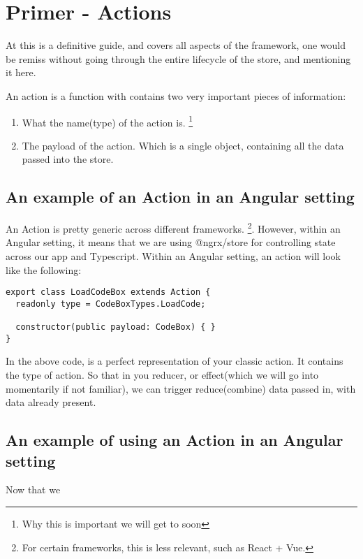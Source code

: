 \maketitle{}
\section{ Primer - Actions }
At this is a definitive guide, and covers all aspects of the framework, one
would be remiss without going through the entire lifecycle of the store, and
mentioning it here.

An action is a function with contains two very important pieces of information:
\begin{enumerate}
  \item What the name(type) of the action is. \footnote{Why this is important we
  will get to soon}
  \item The payload of the action. Which is a single object, containing all the
  data passed into the store.
\end{enumerate}

\subsection{An example of an Action in an Angular setting}
An Action is pretty generic across different frameworks. \footnote{For certain
frameworks, this is less relevant, such as React + Vue.}. However, within an
Angular setting, it means that we are using @ngrx/store for controlling state
across our app and Typescript. Within an Angular setting, an action will look
like the following:
\begin{lstlisting}
export class LoadCodeBox extends Action {
  readonly type = CodeBoxTypes.LoadCode;

  constructor(public payload: CodeBox) { }
}
\end{lstlisting}

In the above code, is a perfect representation of your classic action. It
contains the type of action. So that in you reducer, or effect(which we will
go into momentarily if not familiar), we can trigger reduce(combine) data passed
in, with data already present.


\subsection{An example of using an Action in an Angular setting}
Now that we
